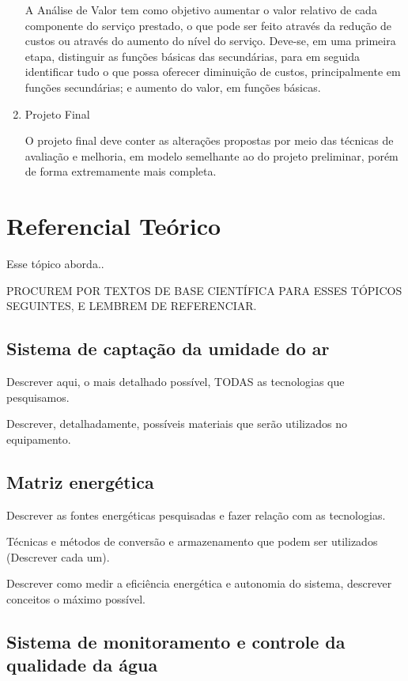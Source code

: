 \begin{enumerate}
    A Análise de Valor tem como objetivo aumentar o valor relativo de cada componente do serviço prestado, o que pode 
    ser feito através da redução de custos ou através do aumento do nível do serviço. Deve-se, em uma primeira etapa,
    distinguir as funções básicas das secundárias, para em seguida identificar tudo o que possa oferecer diminuição de custos,
    principalmente em funções secundárias; e aumento do valor, em funções básicas.
    
  \item Projeto Final
  
    O projeto final deve conter as alterações propostas por meio das técnicas de avaliação e melhoria, em modelo semelhante
    ao do projeto preliminar, porém de forma extremamente mais completa.
    
  \end{enumerate}

  
  \section{Referencial Teórico}
  
    Esse tópico aborda..
    
    PROCUREM POR TEXTOS DE BASE CIENTÍFICA PARA ESSES TÓPICOS SEGUINTES, E LEMBREM DE REFERENCIAR.
    
    \subsection{Sistema de captação da umidade do ar}
    
    Descrever aqui, o mais detalhado possível, TODAS as tecnologias que pesquisamos.
    
    Descrever, detalhadamente, possíveis materiais que serão utilizados no equipamento.
    
    \subsection{Matriz energética}
    
    Descrever as fontes energéticas pesquisadas e fazer relação com as tecnologias.
    
    Técnicas e métodos de conversão e armazenamento que podem ser utilizados (Descrever cada um).
    
    Descrever como medir a eficiência energética e autonomia do sistema, descrever conceitos o máximo possível.
    
    \subsection{Sistema de monitoramento e controle da qualidade da água}
      
